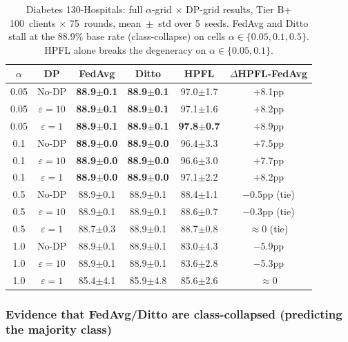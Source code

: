 \documentclass[conference]{IEEEtran}
\begin{document}
\begin{table}[htbp]
\centering
\caption{Diabetes 130-Hospitals: full $\alpha$-grid $\times$ DP-grid results, Tier B+ 100~clients $\times$ 75~rounds, mean~$\pm$~std over 5~seeds. FedAvg and Ditto stall at the 88.9\% base rate (class-collapse) on cells $\alpha\in\{0.05, 0.1, 0.5\}$. HPFL alone breaks the degeneracy on $\alpha\in\{0.05, 0.1\}$.}
\label{tab:tier_b_diab_collapse}
\small
\setlength{\tabcolsep}{4pt}
\begin{tabular}{cccccc}
\toprule
\textbf{$\alpha$} & \textbf{DP} & \textbf{FedAvg} & \textbf{Ditto} & \textbf{HPFL} & \textbf{$\Delta$HPFL-FedAvg} \\
\midrule
0.05 & No-DP & \textbf{88.9$\pm$0.1} & \textbf{88.9$\pm$0.1} & 97.0$\pm$1.7 & $+$8.1pp \\
0.05 & $\varepsilon{=}10$ & \textbf{88.9$\pm$0.1} & \textbf{88.9$\pm$0.1} & 97.1$\pm$1.6 & $+$8.2pp \\
0.05 & $\varepsilon{=}1$ & \textbf{88.9$\pm$0.1} & \textbf{88.9$\pm$0.1} & \textbf{97.8$\pm$0.7} & $+$8.9pp \\
0.1 & No-DP & \textbf{88.9$\pm$0.0} & \textbf{88.9$\pm$0.0} & 96.4$\pm$3.3 & $+$7.5pp \\
0.1 & $\varepsilon{=}10$ & \textbf{88.9$\pm$0.0} & \textbf{88.9$\pm$0.0} & 96.6$\pm$3.0 & $+$7.7pp \\
0.1 & $\varepsilon{=}1$ & \textbf{88.9$\pm$0.0} & \textbf{88.9$\pm$0.0} & 97.1$\pm$2.2 & $+$8.2pp \\
0.5 & No-DP & 88.9$\pm$0.1 & 88.9$\pm$0.1 & 88.4$\pm$1.1 & $-$0.5pp (tie) \\
0.5 & $\varepsilon{=}10$ & 88.9$\pm$0.1 & 88.9$\pm$0.1 & 88.6$\pm$0.7 & $-$0.3pp (tie) \\
0.5 & $\varepsilon{=}1$ & 88.7$\pm$0.3 & 88.9$\pm$0.1 & 88.7$\pm$0.8 & $\approx$0 (tie) \\
1.0 & No-DP & 88.9$\pm$0.1 & 88.9$\pm$0.1 & 83.0$\pm$4.3 & $-$5.9pp \\
1.0 & $\varepsilon{=}10$ & 88.9$\pm$0.1 & 88.9$\pm$0.1 & 83.6$\pm$2.8 & $-$5.3pp \\
1.0 & $\varepsilon{=}1$ & 85.4$\pm$4.1 & 85.9$\pm$4.8 & 85.6$\pm$2.6 & $\approx$0 \\
\bottomrule
\end{tabular}
\end{table}

\subsubsection*{Evidence that FedAvg/Ditto are class-collapsed (predicting the majority class)}
\end{document}
